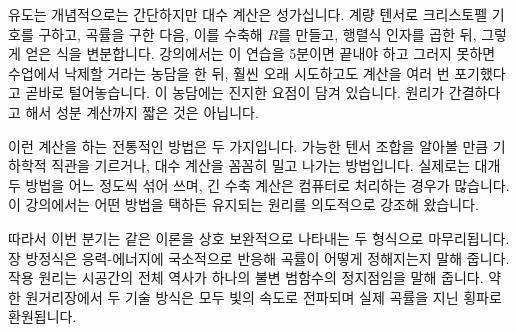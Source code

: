 유도는 개념적으로는 간단하지만 대수 계산은 성가십니다. 계량 텐서로 크리스토펠 기호를 구하고, 곡률을 구한 다음, 이를 수축해 \(R\)를 만들고, 행렬식 인자를 곱한 뒤, 그렇게 얻은 식을 변분합니다. 강의에서는 이 연습을 5분이면 끝내야 하고 그러지 못하면 수업에서 낙제할 거라는 농담을 한 뒤, 훨씬 오래 시도하고도 계산을 여러 번 포기했다고 곧바로 털어놓습니다. 이 농담에는 진지한 요점이 담겨 있습니다. 원리가 간결하다고 해서 성분 계산까지 짧은 것은 아닙니다.

\begin{classroomqa}
\end{classroomqa}

이런 계산을 하는 전통적인 방법은 두 가지입니다. 가능한 텐서 조합을 알아볼 만큼 기하학적 직관을 기르거나, 대수 계산을 꼼꼼히 밀고 나가는 방법입니다. 실제로는 대개 두 방법을 어느 정도씩 섞어 쓰며, 긴 수축 계산은 컴퓨터로 처리하는 경우가 많습니다. 이 강의에서는 어떤 방법을 택하든 유지되는 원리를 의도적으로 강조해 왔습니다.

\begin{classroomqa}
\end{classroomqa}

따라서 이번 분기는 같은 이론을 상호 보완적으로 나타내는 두 형식으로 마무리됩니다. 장 방정식은 응력-에너지에 국소적으로 반응해 곡률이 어떻게 정해지는지 말해 줍니다. 작용 원리는 시공간의 전체 역사가 하나의 불변 범함수의 정지점임을 말해 줍니다. 약한 원거리장에서 두 기술 방식은 모두 빛의 속도로 전파되며 실제 곡률을 지닌 횡파로 환원됩니다.
